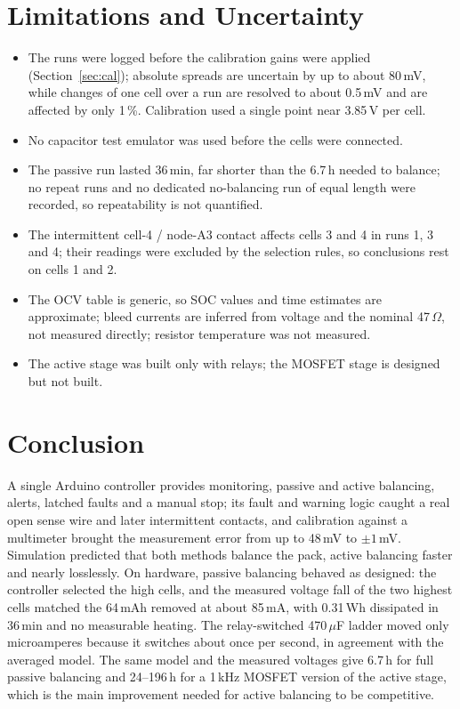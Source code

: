 \documentclass[conference]{IEEEtran}
\begin{document}
\section{Limitations and Uncertainty}
\begin{itemize}
\item The runs were logged before the calibration gains were applied (Section~\ref{sec:cal}); absolute spreads
are uncertain by up to about 80\,mV, while changes of one cell over a run are resolved to about 0.5\,mV and are
affected by only 1\,\%. Calibration used a single point near 3.85\,V per cell.
\item No capacitor test emulator was used before the cells were connected.
\item The passive run lasted 36\,min, far shorter than the 6.7\,h needed to balance; no repeat runs and no
dedicated no-balancing run of equal length were recorded, so repeatability is not quantified.
\item The intermittent cell-4 / node-A3 contact affects cells 3 and 4 in runs 1, 3 and 4; their readings were
excluded by the selection rules, so conclusions rest on cells 1 and 2.
\item The OCV table is generic, so SOC values and time estimates are approximate; bleed currents are inferred from
voltage and the nominal 47\,$\Omega$, not measured directly; resistor temperature was not measured.
\item The active stage was built only with relays; the MOSFET stage is designed but not built.
\end{itemize}

\section{Conclusion}
A single Arduino controller provides monitoring, passive and active balancing, alerts, latched faults and a manual
stop; its fault and warning logic caught a real open sense wire and later intermittent contacts, and calibration
against a multimeter brought the measurement error from up to 48\,mV to $\pm1$\,mV. Simulation
predicted that both methods balance the pack, active balancing faster and nearly losslessly. On hardware, passive
balancing behaved as designed: the controller selected the high cells, and the measured voltage fall of the two highest cells matched the 64\,mAh removed at about 85\,mA, with
0.31\,Wh dissipated in 36\,min and no measurable heating. The
relay-switched 470\,$\mu$F ladder moved only microamperes because it switches about once per second, in agreement
with the averaged model. The same model and the measured voltages give 6.7\,h for full passive balancing and
24--196\,h for a 1\,kHz MOSFET version of the active stage, which is the main improvement needed for active
balancing to be competitive.
\end{document}
